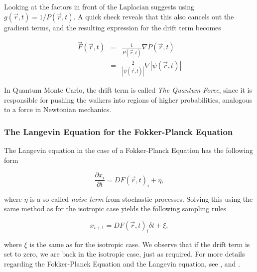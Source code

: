 Looking at the factors in front of the Laplacian suggests using $g(\vec r, t) = 1/P(\vec r, t)$. A quick check reveals that this also cancels out the gradient terms, and the resulting expression for the drift term becomes

\begin{eqnarray}
 \vec F(\vec r, t) &=& \frac{1}{P(\vec r, t)}\nabla P(\vec r, t) \nonumber \\
                   &=& \frac{2}{|\psi(\vec r, t)|}\nabla |\psi(\vec r, t)|
\end{eqnarray}

In Quantum Monte Carlo, the drift term is called \textit{The Quantum Force}, since it is responsible for pushing the walkers into regions of higher probabilities, analogous to a force in Newtonian mechanics.

\subsubsection{The Langevin Equation for the Fokker-Planck Equation}

The Langevin equation in the case of a Fokker-Planck Equation has the following form

\begin{equation}
 \frac{\partial x_i}{\partial t} = D F(\vec r, t)_i + \eta,
\end{equation}

where $\eta$ is a so-called \textit{noise term} from stochastic processes. Solving this using the same method as for the isotropic case yields the following sampling rules

\begin{equation}
 x_{i+1} = DF(\vec r, t)_i\delta t + \xi,
\end{equation}

where $\xi$ is the same as for the isotropic case. We observe that if the drift term is set to zero, we are back in the isotropic case, just as required. For more details regarding the Fokker-Planck Equation and the Langevin equation, see \cite{Gardiner:2004bk}, \cite{risken1989fpe} and \cite{langevin}.





